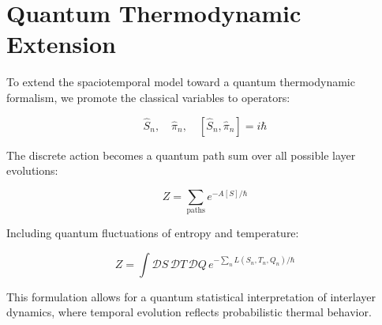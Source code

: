
\section{Quantum Thermodynamic Extension}

To extend the spaciotemporal model toward a quantum thermodynamic formalism, we promote the classical variables to operators:

\begin{equation*}
\hat{S}_n, \quad \hat{\pi}_n, \quad [\hat{S}_n, \hat{\pi}_n] = i\hbar
\end{equation*}

The discrete action becomes a quantum path sum over all possible layer evolutions:

\begin{equation*}
Z = \sum_{\text{paths}} e^{-A[S]/\hbar}
\end{equation*}

Including quantum fluctuations of entropy and temperature:

\begin{equation*}
Z = \int \mathcal{D}S\, \mathcal{D}T\, \mathcal{D}Q\, e^{- \sum_n L(S_n, T_n, Q_n)/\hbar}
\end{equation*}

This formulation allows for a quantum statistical interpretation of interlayer dynamics, where temporal evolution reflects probabilistic thermal behavior.

